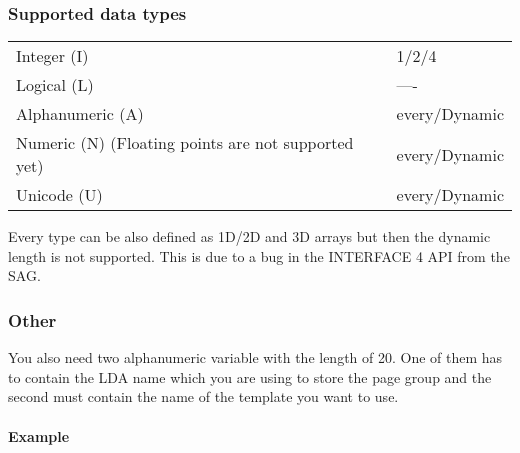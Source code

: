 \documentclass[letterpaper,10pt,english]{sphinxmanual}
\begin{document}
\subsubsection{Supported data types}
\label{\detokenize{natural:datatypes}}\label{\detokenize{natural:supported-data-types}}
\noindent\begin{tabulary}{\linewidth}{|L|L|}
\hline
{}\relax &\relax \\
\hline
Integer (I)
&
1/2/4
\\
\hline
Logical (L)
&
----
\\
\hline
Alphanumeric (A)
&
every/Dynamic
\\
\hline
Numeric (N) (Floating points are not supported yet)
&
every/Dynamic
\\
\hline
Unicode (U)
&
every/Dynamic
\\
\hline\end{tabulary}


Every type can be also defined as 1D/2D and 3D arrays but then the dynamic length is not supported. This is due to a bug in the INTERFACE 4 API from the SAG.


\subsubsection{Other}
\label{\detokenize{natural:other}}
You also need two alphanumeric variable with the length of 20. One of them has to contain the LDA name which you are using to store the page group and the second must contain the name of the template you want to use.


\paragraph{Example}
\label{\detokenize{natural:id1}}
\begin{sphinxVerbatim}[commandchars=\\\{\}]
 
   

   
   
\end{sphinxVerbatim}
\end{document}
